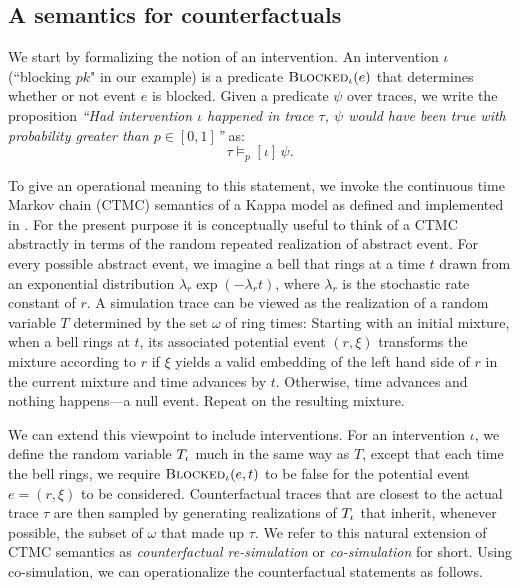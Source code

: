 \subsection{A semantics for counterfactuals}




We start by formalizing the notion of an intervention. An intervention
$\iota$ (``blocking $pk$" in our example) is a predicate
${\textsc{Blocked}}_{\iota}(e)$ that determines whether or not event $e$ is
blocked. Given a predicate $\psi$ over traces, we write
the proposition \textit{``Had intervention $\iota$ happened in trace
  $\tau$, $\psi$ would have been true with probability greater than
  $p \in [0,1]$''} as:
\[ \tau \models_p [\iota] \, \psi.
\]

To give an operational meaning to this statement, we invoke the
continuous time Markov chain (CTMC) semantics of a Kappa model as
defined and implemented in
\cite{DanosEtAl-APLAS07,BoutillierEK17}. For the present purpose it is
conceptually useful to think of a CTMC abstractly in terms of the
random repeated realization of abstract event. For every possible
abstract event, we imagine a bell that rings at a time $t$ drawn from
an exponential distribution $\lambda_r\exp(-\lambda_r t)$, where
$\lambda_r$ is the stochastic rate constant of $r$. A simulation trace
can be viewed as the realization of a random variable $T$ determined
by the set $\omega$ of ring times: Starting with an initial mixture,
when a bell rings at $t$, its associated potential event $(r, \xi)$
transforms the mixture according to $r$ if $\xi$ yields a valid
embedding of the left hand side of $r$ in the current mixture and time
advances by $t$. Otherwise, time advances and nothing happens---a null
event. Repeat on the resulting mixture.

We can extend this viewpoint to include interventions. For an
intervention $\iota$, we define the random variable ${T_\iota}{}$ much in
the same way as $T$, except that each time the bell rings, we require
${\textsc{Blocked}}_{\iota}(e, t)$ to be false for the potential event
$e=(r, \xi)$ to be considered.  Counterfactual traces that are closest
to the actual trace $\tau$ are then sampled by generating realizations
of ${T_\iota}{}$ that inherit, whenever possible, the subset of $\omega$
that made up $\tau$. 
We refer to this natural extension of CTMC semantics as
\textit{counterfactual re-simulation} or \textit{co-simulation} for
short. Using co-simulation, we can operationalize the counterfactual
statements as follows.

